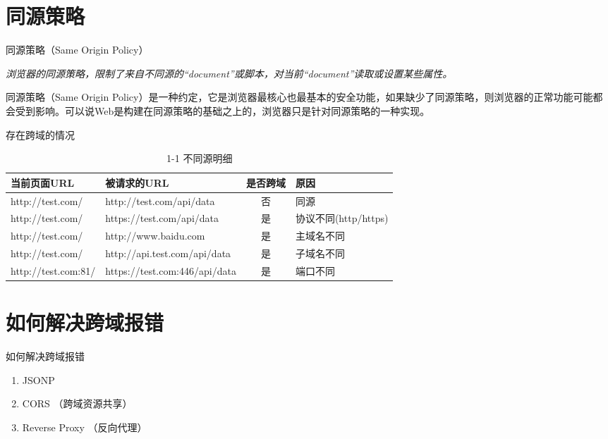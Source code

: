 \documentclass[aspectratio=169,xcolor=dvipsnames,UTF8]{beamer}
\begin{document}
	\section{同源策略}
	\begin{frame}{同源策略（Same Origin Policy）}
		\begin{block}{}
			\emph{浏览器的同源策略，限制了来自不同源的“document”或脚本，对当前“document”读取或设置某些属性。} 
		\end{block}
		\vspace{2em}
		\setlength{\parindent}{2em}同源策略（Same Origin Policy）是一种约定，它是浏览器最核心也最基本的安全功能，如果缺少了同源策略，则浏览器的正常功能可能都会受到影响。可以说Web是构建在同源策略的基础之上的，浏览器只是针对同源策略的一种实现。
	\end{frame}
	
	\begin{frame}{存在跨域的情况}
		\begin{table}
			\begin{tabular}{l l c l}
				\toprule
				\textbf{当前页面URL}       & \textbf{被请求的URL}       & \textbf{是否跨域}       & \textbf{原因}       \\
				\midrule
				http://test.com/       & http://test.com/api/data       &       否 &       同源               \\
				http://test.com/       & https://test.com/api/data      &       是 &       协议不同(http/https)\\
				http://test.com/       & http://www.baidu.com           &       是 &       主域名不同           \\
				http://test.com/       & http://api.test.com/api/data   &       是 &       子域名不同           \\
				http://test.com:81/    & https://test.com:446/api/data  &       是 &       端口不同    \\
				\bottomrule
			\end{tabular}
			\caption{1-1 不同源明细 } 
		\end{table}
	\end{frame}
	
	\section{如何解决跨域报错}
	\begin{frame}{如何解决跨域报错}
		\begin{enumerate}
			\item JSONP 
			\item CORS （跨域资源共享）
			\item Reverse Proxy （反向代理）
		\end{enumerate}
	\end{frame}
	
\end{document}

